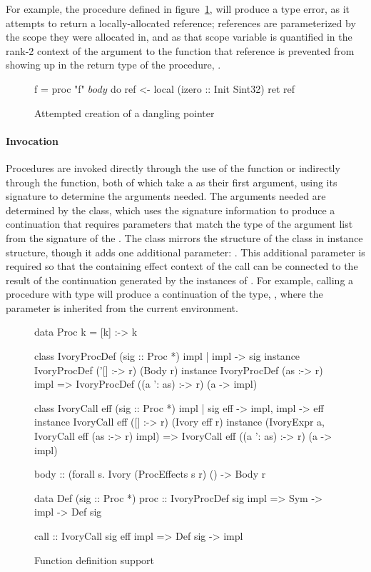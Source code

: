 For example, the procedure  defined in figure~\ref{fig:proc-def}, will
produce a type error, as it attempts to return a locally-allocated reference;
references are parameterized by the scope they were allocated in, and as that
scope variable is quantified in the rank-2 context of the argument to the
 function that reference is prevented from showing up in the return
type of the procedure, .

\begin{figure}[h]
\begin{code}
f = proc "f" $ body $ do
  ref <- local (izero :: Init Sint32)
  ret ref
\end{code}
\caption{Attempted creation of a dangling pointer}
\label{fig:proc-def}
\end{figure}

\paragraph{Invocation} Procedures are invoked directly through the use of the
 function or indirectly through the  function, both of which
take a  as their first argument, using its signature to determine the
arguments needed.  The arguments needed are determined by the 
class, which uses the signature information to produce a continuation that
requires parameters that match the type of the argument list from the signature
of the .  The  class mirrors the structure of the
 class in instance structure, though it adds one additional
parameter: .  This additional parameter is required so that the
containing effect context of the call can be connected to the result of the
continuation generated by the instances of .  For example, calling
a procedure with type  will produce a
continuation of the type, , where the 
parameter is inherited from the current environment.

\begin{figure}[h]
\begin{code}
data Proc k = [k] :-> k

class IvoryProcDef (sig :: Proc *) impl | impl -> sig
instance IvoryProcDef ('[] :-> r) (Body r)
instance IvoryProcDef (as :-> r) impl
  => IvoryProcDef ((a ': as) :-> r) (a -> impl)

class IvoryCall eff (sig :: Proc *) impl
  | sig eff -> impl, impl -> eff
instance IvoryCall eff ([] :-> r) (Ivory eff r)
instance (IvoryExpr a, IvoryCall eff (as :-> r) impl)
  => IvoryCall eff ((a ': as) :-> r) (a -> impl)

body :: (forall s. Ivory (ProcEffects s r) () -> Body r

data Def (sig :: Proc *)
proc :: IvoryProcDef sig impl
     => Sym -> impl -> Def sig

call :: IvoryCall sig eff impl => Def sig -> impl
\end{code}
\caption{Function definition support}
\label{fig:proc-defs}
\end{figure}

